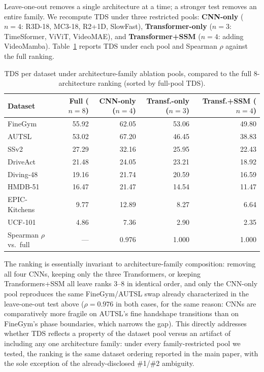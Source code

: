\documentclass[runningheads]{llncs}
\newcommand{\tabtight}{\setlength{\tabcolsep}{3.5pt}\renewcommand{\arraystretch}{1.12}}
\newcommand{\TDS}{\textsc{TDS}}
\begin{document}
Leave-one-out removes a single architecture at a time; a stronger test removes an entire family. We recompute \TDS{} under three restricted pools: \textbf{CNN-only} ($n{=}4$: R3D-18, MC3-18, R2+1D, SlowFast), \textbf{Transformer-only} ($n{=}3$: TimeSformer, ViViT, VideoMAE), and \textbf{Transformer+SSM} ($n{=}4$: adding VideoMamba). Table~\ref{tab:family_ablation} reports \TDS{} under each pool and Spearman $\rho$ against the full ranking.

\begin{table}[!htbp]
\centering
\caption{\TDS{} per dataset under architecture-family ablation pools, compared to the full 8-architecture ranking (sorted by full-pool \TDS{}).}
\label{tab:family_ablation}
\scriptsize\tabtight
\begin{tabular}{l r r r r}
\toprule
Dataset & Full ($n{=}8$) & CNN-only ($n{=}4$) & Transf.-only ($n{=}3$) & Transf.+SSM ($n{=}4$) \\
\midrule
FineGym       & 55.92 & 62.05 & 53.06 & 49.80 \\
AUTSL         & 53.02 & 67.20 & 46.45 & 38.83 \\
SSv2          & 27.29 & 32.16 & 25.95 & 22.43 \\
DriveAct      & 21.48 & 24.05 & 23.21 & 18.92 \\
Diving-48     & 19.16 & 21.74 & 20.59 & 16.59 \\
HMDB-51       & 16.47 & 21.47 & 14.54 & 11.47 \\
EPIC-Kitchens &  9.77 & 12.89 &  8.27 &  6.64 \\
UCF-101       &  4.86 &  7.36 &  2.90 &  2.35 \\
\midrule
Spearman $\rho$ vs.\ full & --- & 0.976 & 1.000 & 1.000 \\
\bottomrule
\end{tabular}
\end{table}

The ranking is essentially invariant to architecture-family composition: removing all four CNNs, keeping only the three Transformers, or keeping Transformers+SSM all leave ranks 3--8 in identical order, and only the CNN-only pool reproduces the same FineGym/AUTSL swap already characterized in the leave-one-out test above ($\rho=0.976$ in both cases, for the same reason: CNNs are comparatively more fragile on AUTSL's fine handshape transitions than on FineGym's phase boundaries, which narrows the gap). This directly addresses whether \TDS{} reflects a property of the dataset pool versus an artifact of including any one architecture family: under every family-restricted pool we tested, the ranking is the same dataset ordering reported in the main paper, with the sole exception of the already-disclosed \#1/\#2 ambiguity.
\end{document}
